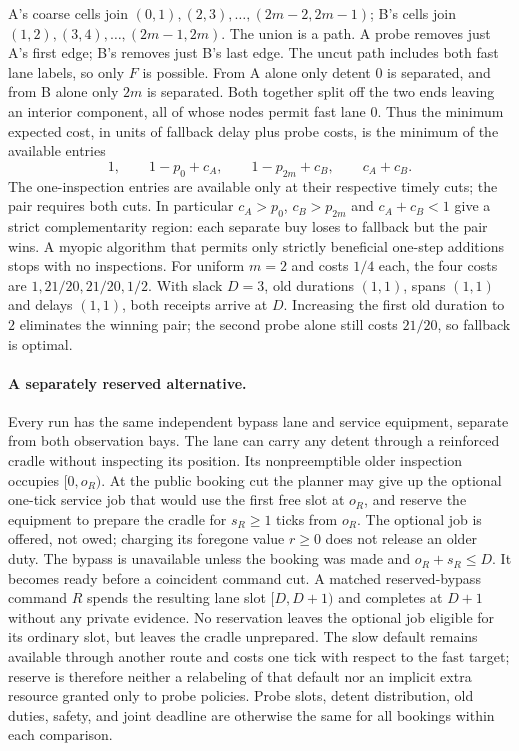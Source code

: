 \documentclass[11pt]{article}
\begin{document}
A's coarse cells join $(0,1),(2,3),\ldots,(2m-2,2m-1)$; B's cells join $(1,2),(3,4),\ldots,(2m-1,2m)$. The union is a path. A probe removes just A's first edge; B's removes just B's last edge. The uncut path includes both fast lane labels, so only $F$ is possible. From A alone only detent $0$ is separated, and from B alone only $2m$ is separated. Both together split off the two ends leaving an interior component, all of whose nodes permit fast lane $0$. Thus the minimum expected cost, in units of fallback delay plus probe costs, is the minimum of the available entries
\[
 1,\qquad 1-p_0+c_A,\qquad 1-p_{2m}+c_B,\qquad c_A+c_B.
\]
The one-inspection entries are available only at their respective timely cuts; the pair requires both cuts. In particular $c_A>p_0$, $c_B>p_{2m}$ and $c_A+c_B<1$ give a strict complementarity region: each separate buy loses to fallback but the pair wins. A myopic algorithm that permits only strictly beneficial one-step additions stops with no inspections. For uniform $m=2$ and costs $1/4$ each, the four costs are $1,21/20,21/20,1/2$. With slack $D=3$, old durations $(1,1)$, spans $(1,1)$ and delays $(1,1)$, both receipts arrive at $D$. Increasing the first old duration to $2$ eliminates the winning pair; the second probe alone still costs $21/20$, so fallback is optimal.

\paragraph{A separately reserved alternative.}
Every run has the same independent bypass lane and service equipment, separate from both observation bays. The lane can carry any detent through a reinforced cradle without inspecting its position. Its nonpreemptible older inspection occupies $[0,o_R)$. At the public booking cut the planner may give up the optional one-tick service job that would use the first free slot at $o_R$, and reserve the equipment to prepare the cradle for $s_R\ge1$ ticks from $o_R$. The optional job is offered, not owed; charging its foregone value $r\ge0$ does not release an older duty. The bypass is unavailable unless the booking was made and $o_R+s_R\le D$. It becomes ready before a coincident command cut. A matched reserved-bypass command $R$ spends the resulting lane slot $[D,D+1)$ and completes at $D+1$ without any private evidence. No reservation leaves the optional job eligible for its ordinary slot, but leaves the cradle unprepared. The slow default remains available through another route and costs one tick with respect to the fast target; reserve is therefore neither a relabeling of that default nor an implicit extra resource granted only to probe policies. Probe slots, detent distribution, old duties, safety, and joint deadline are otherwise the same for all bookings within each comparison.
\end{document}
